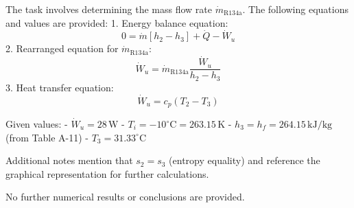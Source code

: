 The task involves determining the mass flow rate \( \dot{m}_{\text{R134a}} \). The following equations and values are provided:  
1. Energy balance equation:  
\[
0 = \dot{m} \left[ h_2 - h_3 \right] + \dot{Q} - \dot{W}_u
\]  
2. Rearranged equation for \( \dot{m}_{\text{R134a}} \):  
\[
\dot{W}_u = \dot{m}_{\text{R134a}} \frac{\dot{W}_u}{h_2 - h_3}
\]  
3. Heat transfer equation:  
\[
\dot{W}_u = c_p \left( T_2 - T_3 \right)
\]  

Given values:  
- \( \dot{W}_u = 28 \, \text{W} \)  
- \( T_i = -10^\circ\text{C} = 263.15 \, \text{K} \)  
- \( h_3 = h_f = 264.15 \, \text{kJ/kg} \) (from Table A-11)  
- \( T_3 = 31.33^\circ\text{C} \)  

Additional notes mention that \( s_2 = s_3 \) (entropy equality) and reference the graphical representation for further calculations.  

No further numerical results or conclusions are provided.